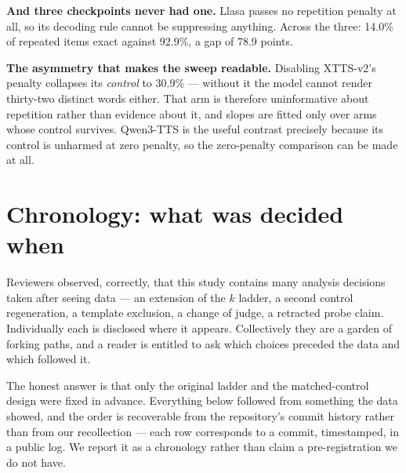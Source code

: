 \documentclass[11pt]{article}
\begin{document}
\noindent\textbf{And three checkpoints never had one.} Llasa passes no
repetition penalty at all, so its decoding rule cannot be suppressing anything.
Across the three: 14.0\% of repeated items exact against 92.9\%, a gap of
78.9 points.

\noindent\textbf{The asymmetry that makes the sweep readable.} Disabling
XTTS-v2's penalty collapses its \emph{control} to 30.9\% --- without it the
model cannot render thirty-two distinct words either. That arm is therefore
uninformative about repetition rather than evidence about it, and slopes are
fitted only over arms whose control survives. Qwen3-TTS is the useful contrast
precisely because its control is unharmed at zero penalty, so the zero-penalty
comparison can be made at all.


\section{Chronology: what was decided when}
\label{sec:s16}

Reviewers observed, correctly, that this study contains many analysis decisions
taken after seeing data --- an extension of the $k$ ladder, a second control
regeneration, a template exclusion, a change of judge, a retracted probe claim.
Individually each is disclosed where it appears. Collectively they are a garden
of forking paths, and a reader is entitled to ask which choices preceded the data
and which followed it.

The honest answer is that only the original ladder and the matched-control design
were fixed in advance. Everything below followed from something the data showed,
and the order is recoverable from the repository's commit history rather than
from our recollection --- each row corresponds to a commit, timestamped, in a
public log. We report it as a chronology rather than claim a pre-registration we
do not have.
\end{document}
